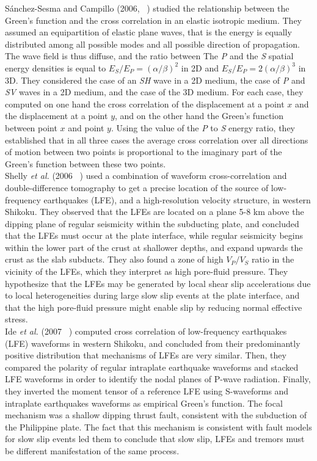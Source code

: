 \documentclass[main.tex]{subfiles}
\begin{document}
S\'anchez-Sesma and Campillo (2006, ~\cite{SAN_2006}) studied the relationship between the Green's function and the cross correlation in an elastic isotropic medium. They assumed an equipartition of elastic plane waves, that is the energy is equally distributed among all possible modes and all possible direction of propagation. The wave field is thus diffuse, and the ratio between The \textit{P} and the \textit{S} spatial energy densities is equal to $E_S / E_P = (\alpha / \beta)^2$ in 2D and $E_S / E_P = 2 (\alpha / \beta)^3$ in 3D. They considered the case of an \textit{SH} wave in a 2D medium, the case of \textit{P} and \textit{SV} waves in a 2D medium, and the case of the 3D medium. For each case, they computed on one hand the cross correlation of the displacement at a point $x$ and the displacement at a point $y$, and on the other hand the Green's function between point $x$ and point $y$. Using the value of the \textit{P} to \textit{S} energy ratio, they established that in all three cases the average cross correlation over all directions of motion between two points is proportional to the imaginary part of the Green's function between these two points. \\

Shelly \textit{et al.} (2006 ~\cite{SHE_2006}) used a combination of waveform cross-correlation and double-difference tomography to get a precise location of the source of low-frequency earthquakes (LFE), and a high-resolution velocity structure, in western Shikoku. They observed that the LFEs are located on a plane 5-8 km above the dipping plane of regular seismicity within the subducting plate, and concluded that the LFEs must occur at the plate interface, while regular seismicity begins within the lower part of the crust at shallower depths, and expand upwards the crust as the slab subducts. They also found a zone of high $V_P / V_S$ ratio in the vicinity of the LFEs, which they interpret as high pore-fluid pressure. They hypothesize that the LFEs may be generated by local shear slip accelerations due to local heterogeneities during large slow slip events at the plate interface, and that the high pore-fluid pressure might enable slip by reducing normal effective stress. \\

Ide \textit{et al.} (2007 ~\cite{IDE_2007_GRL}) computed cross correlation of low-frequency earthquakes (LFE) waveforms in western Shikoku, and concluded from their predominantly positive distribution that mechanisms of LFEs are very similar. Then, they compared the polarity of regular intraplate earthquake waveforms and stacked LFE waveforms in order to identify the nodal planes of P-wave radiation. Finally, they inverted the moment tensor of a reference LFE using S-waveforms and intraplate earthquakes waveforms as empirical Green's function. The focal mechanism was a shallow dipping thrust fault, consistent with the subduction of the Philippine plate. The fact that this mechanism is consistent with fault models for slow slip events led them to conclude that slow slip, LFEs and tremors must be different manifestation of the same process. \\
\end{document}
